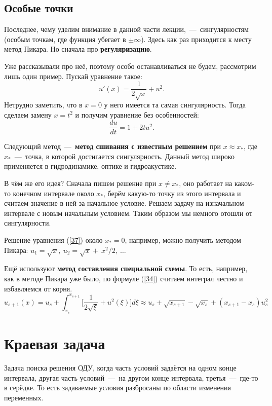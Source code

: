 \documentclass[a4paper,9pt,russian]{article}
\begin{document}
\subsection{Особые точки}\label{point}
    Последнее, чему уделим внимание в данной части лекции,~---~сингулярностям (особым точкам, где функция убегает в $\pm\infty$). Здесь как раз приходится к месту метод Пикара. Но сначала про {\bf регуляризацию}.\par
    Уже рассказывали про неё, поэтому особо останавливаться не будем, рассмотрим лишь один пример. Пускай уравнение такое:
    \begin{equation}\label{37}
     u'(x) = \frac1{2\sqrt{x}} + u^2.
    \end{equation}
    Нетрудно заметить, что в $x=0$ у него имеется та самая сингулярность. Тогда сделаем замену $x=t^2$ и получим уравнение без особенностей:
    \begin{equation}
     \frac{du}{dt} = 1 + 2tu^2.
    \end{equation}\par
    Следующий метод~---~{\bf метод сшивания с известным решением} при $x \approx x_*$, где $x_*$~---~точка, в которой достигается сингулярность. Данный метод широко применяется в гидродинамике, оптике и гидроакустике.\par
    В чём же его идея? Сначала пишем решение при $x \not= x_*$, оно работает на каком-то конечном интервале около $x_*$, берём какую-то точку из этого интервала и считаем значение в ней за начальное условие. Решаем задачу на изначальном интервале с новым начальным условием. Таким образом мы немного отошли от сингулярности.\par
    Решение уравнения (\ref{37}) около $x_* = 0$, например, можно получить методом Пикара: $u_1 = \sqrt{x},\ u_2 = \sqrt{x} + \ {x^2}/{2},\ \ldots$\\ \par
    
    Ещё используют {\bf метод составления специальной схемы}. То есть, например, как в методе Пикара уже было, по формуле (\ref{34}) считаем интеграл честно и избавляемся от корня.
    \begin{equation}
     u_{s+1}(x) = u_s + \int_{x_s}^{x_{s+1}} \biggl[ \frac1{2\sqrt{\xi}}+u^2(\xi)\biggr] d \xi \approx u_s + \sqrt{x_{s+1}}-\sqrt{x_{s}} + (x_{s+1}-x_s)u_s^2
    \end{equation}
\section{Краевая задача} 
    Задача поиска решения ОДУ, когда часть условий задаётся на одном конце интервала, другая часть условий~---~на другом конце интервала, третья~---~где-то в серёдке. То есть задаваемые условия разбросаны по области изменения переменных.
\end{document}
